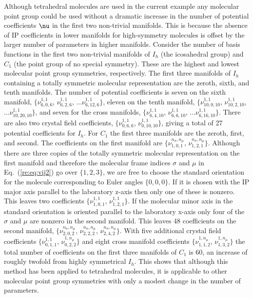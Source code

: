 \documentclass[preprint]{iucr}              %
\newcommand{\mb}[1]{\ensuremath{\mbox{\boldmath $ #1 $}}}
\begin{document}
Although tetrahedral molecules are used in the current example any molecular point group could be used
without a dramatic increase in the number of potential coefficients
$\mb{\nu}$ in the first two non-trivial manifolds. This is because
the absence of IP coefficients in lower manifolds for high-symmetry
molecules is offset by the larger number of parameters in higher
manifolds. Consider the number of basis functions in the first two
non-trivial manifolds of $I_h$
(the icosahedral group) and $C_1$ (the point group of no special symmetry). These are the
highest and lowest molecular point group symmetries, respectively.
The first three manifolds of $I_h$ containing a totally symmetric
molecular representation are the zeroth, sixth, and tenth manifolds.
The number of potential coefficients is seven on the sixth manifold,
$\{\nu_{6,0,6}^{1,1}$, $\nu_{6,2,6}^{1,1}$,
...$\nu_{6,12,6}^{1,1}\}$, eleven on the tenth manifold,
$\{\nu_{10,0,10}^{1,1}$, $\nu_{10,2,10}^{1,1}$,
...$\nu_{10,20,10}^{1,1}\}$, and seven for the cross manifolds,
$\{\nu_{6,4,10}^{1,1}$, $\nu_{6,6,10}^{1,1}$,
...$\nu_{6,16,10}^{1,1}\}$.  There are also two crystal field
coefficients, $\{\nu_{0,6,6}^{1,1}$, $\nu_{0,10,10}^{1,1}\}$, giving
a total of 27 potential coefficients for $I_h$.  For $C_1$ the first
three manifolds are the zeroth, first, and second. The coefficients
on the first manifold are $\{\nu_{1,0,1}^{n_\sigma,n_\mu}$,
$\nu_{1,2,1}^{n_\sigma,n_\mu}\}$. Although there are three copies of
the totally symmetric molecular representation on the first manifold
and therefore the molecular frame indices $\sigma$ and $\mu$ in
Eq.~(\ref{re:eq:vij2}) go over $\{1,2,3\}$, we are free to choose the
standard orientation for the molecule corresponding to Euler angles
$\{0,0,0\}$.  If it is chosen with the IP major axis parallel to the
laboratory z-axis then only one of these is nonzero. This leaves two
coefficients $\{\nu_{1,0,1}^{1,1}$, $\nu_{1,2,1}^{1,1}\}$. If the
molecular minor axis in the standard orientation is oriented
parallel to the laboratory x-axis only four of the $\sigma$ and
$\mu$ are nonzero in the second manifold. This leaves 48
coefficients on the second manifold,
$\{\nu_{2,0,2}^{n_\sigma,n_\mu}$, $\nu_{2,2,2}^{n_\sigma,n_\mu}$,
$\nu_{2,4,2}^{n_\sigma,n_\mu}\}$. With five additional crystal field
coefficients $\{\nu^{1,1}_{0,1,1}$, $\nu^{1,n_\mu}_{0,2,2}\}$ and
eight cross manifold coefficients $\{\nu^{1,n_\mu}_{1,1,2}$,
$\nu^{1,n_\mu}_{1,3,2}\}$ the total number of coefficients on the
first three manifolds of $C_1$ is 60, an increase of roughly twofold
from highly symmetrical $I_h$. This shows that although this method
has been applied to tetrahedral molecules, it is applicable to other
molecular point group symmetries with only a modest change in the
number of parameters.
\end{document}
